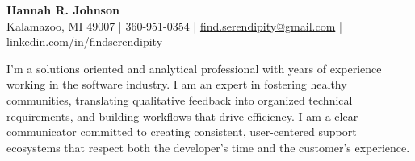 \documentclass[10pt,letterpaper]{article}
\begin{document}
\begin{center}
    {\LARGE \textbf{Hannah R. Johnson}} \\
    \vspace{3pt}
    Kalamazoo, MI 49007 | 360-951-0354 | \href{mailto:find.serendipity@gmail.com}{find.serendipity@gmail.com} | \href{https://www.linkedin.com/in/findserendipity/}{linkedin.com/in/findserendipity}
\end{center}

\vspace{2.5mm}
I'm a solutions oriented and analytical professional with years of experience working in the software industry. I am an expert in fostering healthy communities, translating qualitative feedback into organized technical requirements, and building workflows that drive efficiency. I am a clear communicator committed to creating consistent, user-centered support ecosystems that respect both the developer's time and the customer's experience.
\vspace{1mm}
\end{document}
